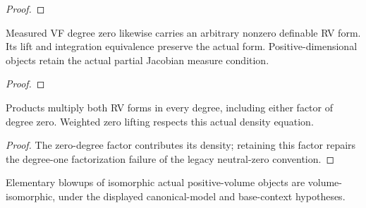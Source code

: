 \begin{proof}


\leanok



\end{proof}

\begin{definition}

\label{s7-zero-vf}


\leanok

Measured VF degree zero likewise carries an arbitrary nonzero definable RV form. Its lift and integration equivalence preserve the actual form. Positive-dimensional objects retain the actual partial Jacobian measure condition.

\end{definition}

\begin{proof}


\leanok



\end{proof}

\begin{lemma}

\label{s7-products}


\leanok

Products multiply both RV forms in every degree, including either factor of degree zero. Weighted zero lifting respects this actual density equation.

\end{lemma}

\begin{proof}


\leanok

The zero-degree factor contributes its density; retaining this factor repairs the degree-one factorization failure of the legacy neutral-zero convention.

\end{proof}

\begin{lemma}

\label{s7-2}


\leanok

Elementary blowups of isomorphic actual positive-volume objects are volume-isomorphic, under the displayed canonical-model and base-context hypotheses.

\end{lemma}


